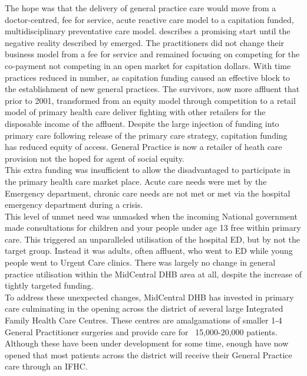 \documentclass[11pt,a4paper]{article}
\begin{document}
The hope was that the delivery of general practice care would move from a doctor-centred, fee for service, acute reactive care model to a capitation funded, multidisciplinary preventative care model. \citet{hefford2005reducing} describes a promising start until the negative reality described by \citet{howell2005restructuring} emerged. The practitioners did not change their business model from a fee for service and remained focusing on competing for the co-payment not competing in an open market for capitation dollars. With time practices reduced in number, as capitation funding caused an effective block to the establishment of new general practices. The survivors, now more affluent that prior to 2001, transformed from an equity model through competition to a retail model of primary health care deliver fighting with other retailers for the disposable income of the affluent. Despite the large injection of funding into primary care following release of the primary care strategy, capitation funding has reduced equity of access. General Practice is now a retailer of heath care provision not the hoped for agent of social equity.\\

This extra funding was insufficient to allow the disadvantaged to participate in the primary health care market place. Acute care needs were met by the Emergency department, chronic care needs are not met or met via the hospital emergency department during a crisis.\\

This level of unmet need was unmasked when the incoming National government made consultations for children and your people under age 13 free within primary care. This triggered an unparalleled utilisation of the hospital ED, but by not the target group. Instead it was adults, often affluent, who went to ED while young people went to Urgent Care clinics. There was largely no change in general practice utilisation within the MidCentral DHB area at all, despite the increase of tightly targeted funding.\\
 
To address these unexpected changes, MidCentral DHB has invested in primary care culminating in the opening across the district of several large Integrated Family Health Care Centres. These centres are amalgamations of smaller 1-4 General Practitioner surgeries and provide care for ~15,000-20,000 patients. Although these have been under development for some time, enough have now opened that most patients across the district will receive their General Practice care through an IFHC.\\
\end{document}
